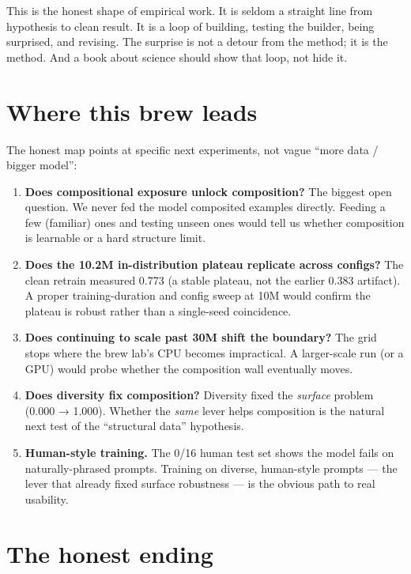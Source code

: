This is the honest shape of empirical work. It is seldom a straight line
from hypothesis to clean result. It is a loop of building, testing the
builder, being surprised, and revising. The surprise is not a detour
from the method; it is the method. And a book about science should show
that loop, not hide it.

\section{Where this brew leads}\label{where-this-brew-leads}

The honest map points at specific next experiments, not vague ``more
data / bigger model'':

\begin{enumerate}
\def\labelenumi{\arabic{enumi}.}
\tightlist
\item
  \textbf{Does compositional exposure unlock composition?} The biggest
  open question. We never fed the model composited examples directly.
  Feeding a few (familiar) ones and testing unseen ones would tell us
  whether composition is learnable or a hard structure limit.
\item
  \textbf{Does the 10.2M in-distribution plateau replicate across
  configs?} The clean retrain measured 0.773 (a stable plateau, not the
  earlier 0.383 artifact). A proper training-duration and config sweep
  at 10M would confirm the plateau is robust rather than a single-seed
  coincidence.
\item
  \textbf{Does continuing to scale past 30M shift the boundary?} The
  grid stops where the brew lab's CPU becomes impractical. A
  larger-scale run (or a GPU) would probe whether the composition wall
  eventually moves.
\item
  \textbf{Does diversity fix composition?} Diversity fixed the
  \emph{surface} problem (0.000 → 1.000). Whether the \emph{same} lever
  helps composition is the natural next test of the ``structural data''
  hypothesis.
\item
  \textbf{Human-style training.} The 0/16 human test set shows the model
  fails on naturally-phrased prompts. Training on diverse, human-style
  prompts --- the lever that already fixed surface robustness --- is the
  obvious path to real usability.
\end{enumerate}

\section{The honest ending}\label{the-honest-ending}

